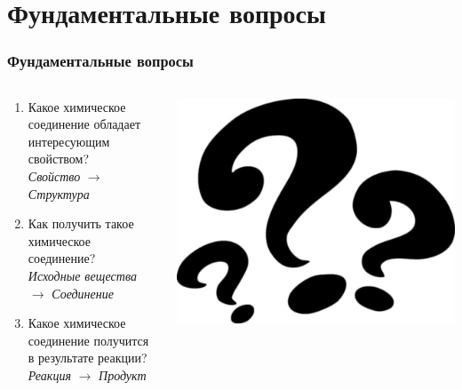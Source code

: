 \section{Фундаментальные вопросы}
\begin{frame}
   \frametitle{Фундаментальные вопросы}
   \begin{columns}
      \begin{column}{0.6\textwidth}
      \begin{enumerate}
         \item Какое {\color{red}химическое соединение} обладает интересующим свойством? \\
            \emph{Свойство} $ \rightarrow $ \emph{Структура}
         \item Как получить такое {\color{red}химическое соединение}? \\
            \emph{Исходные вещества} $ \rightarrow $ \emph{Соединение}
         \item Какое {\color{red}химическое соединение} получится в результате реакции? \\
            \emph{Реакция} $ \rightarrow $ \emph{Продукт}
      \end{enumerate}
      \end{column}
      \begin{column}{0.4\textwidth}
         \includegraphics[scale=0.65]{images/question-marks2.png}
      \end{column}
   \end{columns}
\end{frame}

